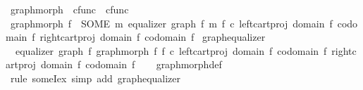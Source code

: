\begin{isabellebody}
\endisatagproof
{\isafoldproof}%
%
\isadelimproof
\isanewline
%
\endisadelimproof
\isanewline
{}\isamarkupfalse%
\ graph{\isacharunderscore}{\kern0pt}morph\ {\isacharcolon}{\kern0pt}{\isacharcolon}{\kern0pt}\ {\isachardoublequoteopen}cfunc\ {\isasymRightarrow}\ cfunc{\isachardoublequoteclose}\ \isanewline
\ {\isachardoublequoteopen}graph{\isacharunderscore}{\kern0pt}morph\ f\ {\isacharequal}{\kern0pt}\ {\isacharparenleft}{\kern0pt}SOME\ m{\isachardot}{\kern0pt}\ equalizer\ {\isacharparenleft}{\kern0pt}graph\ f{\isacharparenright}{\kern0pt}\ m\ {\isacharparenleft}{\kern0pt}f\ {\isasymcirc}\isactrlsub c\ left{\isacharunderscore}{\kern0pt}cart{\isacharunderscore}{\kern0pt}proj\ {\isacharparenleft}{\kern0pt}domain\ f{\isacharparenright}{\kern0pt}\ {\isacharparenleft}{\kern0pt}codomain\ f{\isacharparenright}{\kern0pt}{\isacharparenright}{\kern0pt}\ {\isacharparenleft}{\kern0pt}right{\isacharunderscore}{\kern0pt}cart{\isacharunderscore}{\kern0pt}proj\ {\isacharparenleft}{\kern0pt}domain\ f{\isacharparenright}{\kern0pt}\ {\isacharparenleft}{\kern0pt}codomain\ f{\isacharparenright}{\kern0pt}{\isacharparenright}{\kern0pt}{\isacharparenright}{\kern0pt}{\isachardoublequoteclose}\isanewline
\isanewline
{}\isamarkupfalse%
\ graph{\isacharunderscore}{\kern0pt}equalizer{}{\isacharcolon}{\kern0pt}\isanewline
\ \ {\isachardoublequoteopen}equalizer\ {\isacharparenleft}{\kern0pt}graph\ f{\isacharparenright}{\kern0pt}\ {\isacharparenleft}{\kern0pt}graph{\isacharunderscore}{\kern0pt}morph\ f{\isacharparenright}{\kern0pt}\ {\isacharparenleft}{\kern0pt}f\ {\isasymcirc}\isactrlsub c\ left{\isacharunderscore}{\kern0pt}cart{\isacharunderscore}{\kern0pt}proj\ {\isacharparenleft}{\kern0pt}domain\ f{\isacharparenright}{\kern0pt}\ {\isacharparenleft}{\kern0pt}codomain\ f{\isacharparenright}{\kern0pt}{\isacharparenright}{\kern0pt}\ {\isacharparenleft}{\kern0pt}right{\isacharunderscore}{\kern0pt}cart{\isacharunderscore}{\kern0pt}proj\ {\isacharparenleft}{\kern0pt}domain\ f{\isacharparenright}{\kern0pt}\ {\isacharparenleft}{\kern0pt}codomain\ f{\isacharparenright}{\kern0pt}{\isacharparenright}{\kern0pt}{\isachardoublequoteclose}\isanewline
%
\isadelimproof
\ \ %
\endisadelimproof
%
\isatagproof
{}\isamarkupfalse%
\ graph{\isacharunderscore}{\kern0pt}morph{\isacharunderscore}{\kern0pt}def\ \isamarkupfalse%
\ {\isacharparenleft}{\kern0pt}rule\ someI{\isacharunderscore}{\kern0pt}ex{\isacharcomma}{\kern0pt}\ simp\ add{\isacharcolon}{\kern0pt}\ graph{\isacharunderscore}{\kern0pt}equalizer{\isacharparenright}{\kern0pt}%

\end{isabellebody}
